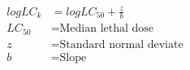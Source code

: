 \documentclass[fleqn, oneside, 11pt]{article}%
\begin{document}
\begin{preview}
\begin{align*}%
logLC_{k} & = logLC_{50}+\frac{z}{b}\nonumber \\
LC_{50} & =  \text{Median lethal dose} \nonumber \\
z & =  \text{Standard normal deviate} \nonumber \\
b & =  \text{Slope} \nonumber \\
\end{align*} 
\end{preview}
\end{document}
